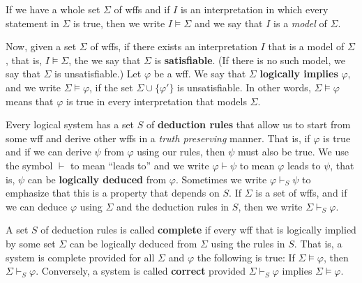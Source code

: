 \documentclass[12pt]{amsart}
\renewcommand{\phi}{\ensuremath{\varphi}}
\begin{document}
If we have a whole set $\Sigma$ of wffs and if $I$ 
is an interpretation in which every statement in
$\Sigma$ is true, then we write $I \models \Sigma$ and we say that $I$ is a
\emph{model} of $\Sigma$.


Now, given a set $\Sigma$ of wffs, if there exists an interpretation $I$ that
is a model of $\Sigma$, that is, $I\models \Sigma$, the we say that $\Sigma$ is
{\bf satisfiable}.  (If there is no such model, we say that $\Sigma$ is
unsatisfiable.)  Let $\phi$ be a wff.  We say that $\Sigma$ {\bf logically implies}
$\phi$, and we write $\Sigma \models \phi$, if the set $\Sigma \cup \{\phi'\}$ is
unsatisfiable.  In other words, $\Sigma\models \phi$ means that $\phi$ is true
in every interpretation that models $\Sigma$.

Every logical system has a set $S$ of {\bf deduction rules} that allow us to start
from some wff and derive other wffs in a \emph{truth preserving} manner.  That
is, if $\phi$ is true and if we can derive $\psi$ from $\phi$ using our rules,
then $\psi$ must also be true.  We use the symbol $\vdash$ to mean ``leads to''
and we write $\phi \vdash \psi$ to mean $\phi$ leads to $\psi$, that is, $\psi$
can be {\bf logically deduced} from
$\phi$. Sometimes we write $\phi \vdash_S \psi$ to emphasize that this is a
property that depends on $S$. %
If $\Sigma$ is a set of wffs, and if we can deduce $\phi$ using
$\Sigma$ and the deduction rules in $S$, then we write $\Sigma \vdash_S \phi$.

A set $S$ of deduction rules is called {\bf complete} if every wff that is
logically implied by some set $\Sigma$ can be logically deduced from $\Sigma$
using the rules in $S$. That is, a system is complete provided for all $\Sigma$ and
$\phi$ the following is true:
If $\Sigma \models \phi$, then $\Sigma \vdash_S \phi$.  Conversely, a system is called 
{\bf correct} provided $\Sigma \vdash_S \phi$ implies $\Sigma \models \phi$. 


\end{document}
